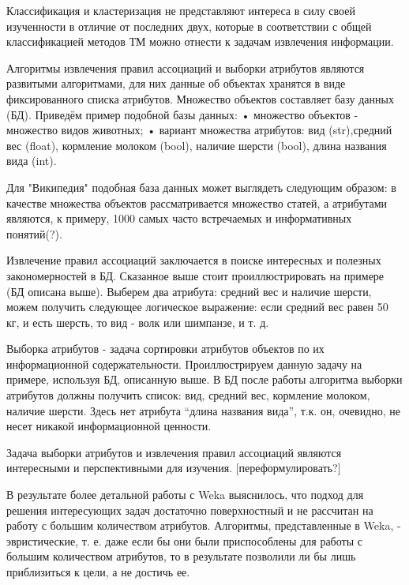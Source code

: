 Классификация и кластеризация не представляют интереса в силу своей изученности в отличие от
последних двух, которые в соответствии с общей классификацией методов ТМ можно отнести к задачам
извлечения информации.

Алгоритмы извлечения правил ассоциаций и выборки атрибутов являются развитыми алгоритмами,
для них данные об объектах хранятся в виде фиксированного списка атрибутов. Множество объектов
составляет базу данных (БД). Приведём пример подобной базы данных:
•	множество объектов - множество видов животных;
•	вариант множества атрибутов: вид (str),средний вес (float), кормление молоком (bool),
наличие шерсти (bool), длина названия вида (int).

Для "Википедия" подобная база данных может выглядеть следующим образом: в качестве множества
объектов рассматривается множество статей, а атрибутами являются, к примеру, 1000 самых часто
встречаемых и информативных понятий(?). 

Извлечение правил ассоциаций заключается в поиске интересных и полезных закономерностей в БД.
Сказанное выше стоит проиллюстрировать на примере (БД описана выше). Выберем два атрибута: средний 
вес и наличие шерсти, можем получить следующее логическое выражение: если средний вес равен 
50 кг, и есть шерсть, то вид - волк или шимпанзе, и т. д.

Выборка атрибутов - задача сортировки атрибутов объектов по их информационной содержательности.
Проиллюстрируем данную задачу на примере, используя БД, описанную выше. В БД после работы 
алгоритма выборки атрибутов должны получить список: вид, средний вес, кормление молоком, 
наличие шерсти. Здесь нет атрибута “длина названия вида”, т.к. он, очевидно, не несет
никакой информационной ценности.

Задача выборки атрибутов и извлечения правил ассоциаций являются интересными и перспективными
для изучения. [переформулировать?]

В результате более детальной работы с Weka выяснилось, что подход для решения интересующих задач
достаточно поверхностный и не рассчитан на работу с большим количеством атрибутов. Алгоритмы, 
представленные в Weka, - эвристические, т. е. даже если бы они были приспособлены для работы с 
большим количеством атрибутов, то в результате позволили ли бы лишь приблизиться к цели, а не
достичь ее.
